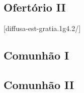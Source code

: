 \AllowPageFlush

\subsection{Ofertório II}\label{subsection:communia/commune-sanctarum/offertorium-2}
[diffusa-est-gratia.1g4.2/]

\AllowPageFlush

\subsection{Comunhão I}\label{subsection:communia/commune-sanctarum/communio-1}

\AllowPageFlush

\subsection{Comunhão II}\label{subsection:communia/commune-sanctarum/communio-2}
